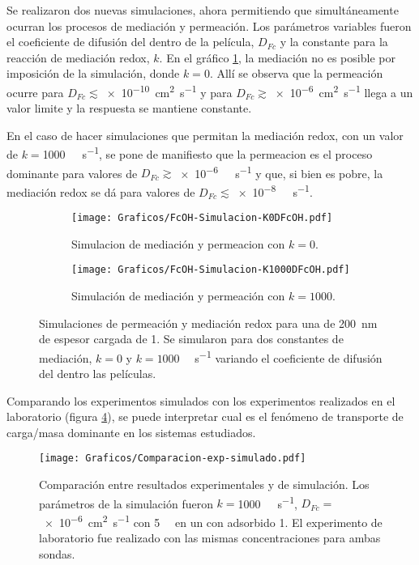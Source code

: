 		Se realizaron dos nuevas simulaciones, ahora permitiendo que simultáneamente ocurran los procesos de mediación y permeación. Los parámetros variables fueron el coeficiente de difusión del \fc\space dentro de la película, $D_{Fc}$ y la constante para la reacción de mediación redox, $k$. En el gráfico \ref{fig:sim_med_k0}, la mediación no es posible por imposición de la simulación, donde $k=0$. Allí se observa que la permeación ocurre para $D_{Fc}\lesssim$\SI{e-10}{\square\cm\per\second} y para $D_{Fc}\gtrsim$\SI{e-6}{\square\cm\per\second} llega a un valor limite y la respuesta se mantiene constante.

		En el caso de hacer simulaciones que permitan la mediación redox, con un valor de $k=$\SI{1000}{\per\Molar\per\second}, se pone de manifiesto que la permeacion es el proceso dominante para valores de $D_{Fc}\gtrsim$\SI{e-6}{\per\Molar\per\second} y que, si bien es pobre, la mediación redox se dá para valores de $D_{Fc}\lesssim$\SI{e-8}{\per\Molar\per\second}.

			\begin{figure}[ht]
				\begin{subfigure}[t]{0.495\textwidth}
					\centering
			 	    \texttt{[image: Graficos/FcOH-Simulacion-K0DFcOH.pdf]}
			        \caption{Simulacion de mediación y permeacion con $k=0$.}
			        \label{fig:sim_med_k0}
			      	\end{subfigure}
				\begin{subfigure}[t]{0.495\textwidth}
					\centering
			 	    \texttt{[image: Graficos/FcOH-Simulacion-K1000DFcOH.pdf]}
			        \caption{Simulación de mediación y permeación con $k=1000$.}
			        \label{fig:sim_med_1000}
			      	\end{subfigure}
			      	\caption[Simulación EQ de mediación/permeación]{Simulaciones de permeación y mediación redox para una \pdm\space de \SI{200}{nm} de espesor cargada de \ru\space \SI{1}{\Molar}. Se simularon para dos constantes de mediación, $k=0$ y $k=1000$ \si{\per\Molar\per\second} variando el coeficiente de difusión del \fc\space dentro las películas.}
			      	\label{fig:sim_med_perm}
			      	\end{figure}
			      	
		Comparando los experimentos simulados con los experimentos realizados en el laboratorio (figura \ref{fig:comp_sim_exp}), se puede interpretar cual es el fenómeno de transporte de carga/masa dominante en los sistemas estudiados. 

				\begin{figure}[ht]
					\centering
			 	    \texttt{[image: Graficos/Comparacion-exp-simulado.pdf]}
			        \caption[Simulación EQ comparadas con datos experimentales]{Comparación entre resultados experimentales y de simulación. Los parámetros de la simulación fueron $k=$\SI{1000}{\per\Molar\per\second}, $D_{Fc}=$ \SI{e-6}{\square\cm\per\second} con \fc\space \SI{5}{\milli\Molar} en un \pdm\space con \ru\space adsorbido \SI{1}{\Molar}. El experimento de laboratorio fue realizado con las mismas concentraciones para ambas sondas.}
			        \label{fig:comp_sim_exp}
			      	\end{figure}
		
